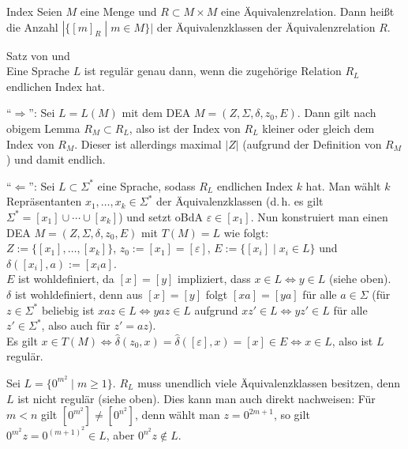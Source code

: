 \linie

\begin{Def}{Index}
    Seien $M$ eine Menge und $R \subset M \times M$ eine Äquivalenzrelation.
    Dann heißt die Anzahl $|\{[m]_R \;|\; m \in M\}|$ der
    Äquivalenzklassen  der Äquivalenzrelation $R$.
\end{Def}

\begin{Satz}{Satz von  und }\\
    Eine Sprache $L$ ist regulär genau dann, wenn
    die zugehörige Relation $R_L$ endlichen Index hat.
\end{Satz}

\begin{Beweis}
    "`$\Rightarrow$"':
    Sei $L = L(M)$ mit dem DEA $M = (Z, \Sigma, \delta, z_0, E)$.
    Dann gilt nach obigem Lemma $R_M \subset R_L$, also ist
    der Index von $R_L$ kleiner oder gleich dem Index von $R_M$.
    Dieser ist allerdings maximal $|Z|$ (aufgrund der Definition von $R_M$)
    und damit endlich.

    "`$\Leftarrow$"':
    Sei $L \subset \Sigma^\ast$ eine Sprache, sodass $R_L$ endlichen Index $k$
    hat.
    Man wählt $k$ Repräsentanten $x_1, \dotsc, x_k \in \Sigma^\ast$ der
    Äquivalenzklassen
    (d.\,h. es gilt $\Sigma^\ast = [x_1] \cup \dotsb \cup [x_k]$)
    und setzt oBdA $\varepsilon \in [x_1]$.
    Nun konstruiert man einen DEA $M = (Z, \Sigma, \delta, z_0, E)$ mit
    $T(M) = L$ wie folgt:\\
    $Z := \{[x_1], \dotsc, [x_k]\}$, $z_0 := [x_1] = [\varepsilon]$,
    $E := \{[x_i] \;|\; x_i \in L\}$ und
    $\delta([x_i], a) := [x_i a]$.\\
    $E$ ist wohldefiniert, da $[x] = [y]$ impliziert,
    dass $x \in L \iff y \in L$ (siehe oben).\\
    $\delta$ ist wohldefiniert, denn aus $[x] = [y]$ folgt
    $[xa] = [ya]$ für alle $a \in \Sigma$
    (für $z \in \Sigma^\ast$ beliebig ist
    $xaz \in L \iff yaz \in L$ aufgrund
    $xz' \in L \iff yz' \in L$ für alle $z' \in \Sigma^\ast$,
    also auch für $z' = az$).\\
    Es gilt $x \in T(M)
    \iff \widehat{\delta}(z_0, x) =
    \widehat{\delta}([\varepsilon], x) =
    [x] \in E \iff x \in L$, also ist $L$ regulär.
\end{Beweis}

\linie

\begin{Bsp}
    Sei $L = \{0^{m^2} \;|\; m \ge 1\}$.
    $R_L$ muss unendlich viele Äquivalenzklassen besitzen, denn $L$ ist nicht
    regulär (siehe oben).
    Dies kann man auch direkt nachweisen:
    Für $m < n$ gilt $[0^{m^2}] \not= [0^{n^2}]$, denn
    wählt man $z = 0^{2m + 1}$, so gilt
    $0^{m^2} z = 0^{(m+1)^2} \in L$, aber $0^{n^2} z \notin L$.
\end{Bsp}

